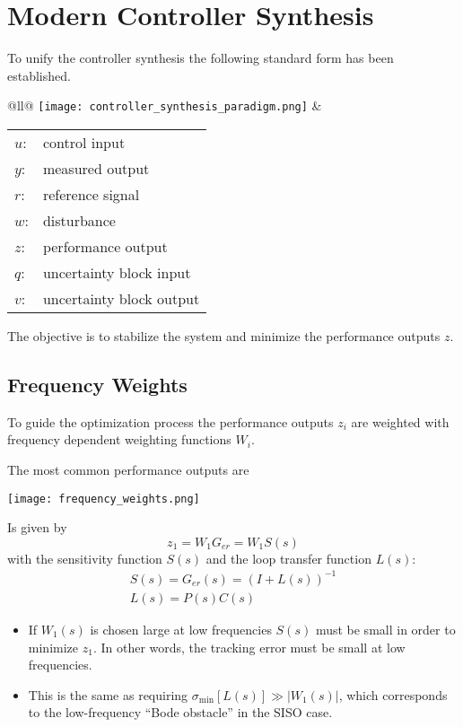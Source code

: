 \section{Modern Controller Synthesis}
To unify the controller synthesis the following standard form has been established.


\setlength{\oldtabcolsep}{\tabcolsep}\setlength\tabcolsep{2pt}

\begin{tabularx}{\linewidth}{@{}ll@{}}
    \texttt{[image: controller\_synthesis\_paradigm.png]}
     &
    {\begin{tabularx}{\linewidth}{@{}ll@{}}
                 $u$: & control input            \\
                 $y$: & measured output          \\
                 $r$: & reference signal         \\
                 $w$: & disturbance              \\
                 $z$: & performance output       \\
                 $q$: & uncertainty block input  \\
                 $v$: & uncertainty block output
             \end{tabularx}
        }
\end{tabularx}

\setlength{\tabcolsep}{\oldtabcolsep}


\newpar{}
The objective is to stabilize the system and minimize the performance outputs $z$.

\subsection{Frequency Weights}

To guide the optimization process the performance outputs $z_i$ are weighted with frequency dependent weighting functions $W_i$.

The most common performance outputs are
\begin{center}
    \texttt{[image: frequency\_weights.png]}
\end{center}


Is given by
\begin{equation*}
    z_1=W_1 G_{er} = W_1 S(s)
\end{equation*}
with the sensitivity function $S(s)$ and the loop transfer function $L(s)$:
\begin{gather*}
    S(s)=G_{er}(s) = {(I+L(s))}^{-1} \\
    L(s)=P(s)C(s)
\end{gather*}
\begin{itemize}
    \item If $W_1(s)$ is chosen large at low frequencies $S(s)$ must be small in order to minimize $z_1$. In other words, the tracking error must be small at low frequencies.
    \item This is the same as requiring $\sigma_{\min}[L(s)] \gg |W_1(s)|$, which corresponds to the low-frequency ``Bode obstacle'' in the SISO case.
\end{itemize}

